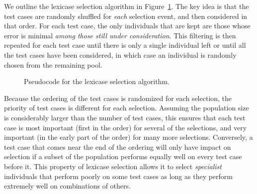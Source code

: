\documentclass{sig-alternate}
\begin{document}
We outline the lexicase selection algorithm in Figure~\ref{lexicase}. The key idea is that the test cases are randomly shuffled for \emph{each} selection event, and then considered in that order. For each test case, the only individuals that are kept are those whose error is minimal \emph{among those still under consideration}. This filtering is then repeated for each test case until there is only a single individual left or until all the test cases have been considered, in which case an individual is randomly chosen from the remaining pool.


\begin{figure}%
\centering
{}
\caption{\label{lexicase}Pseudocode for the lexicase selection algorithm.}
\end{figure}

Because the ordering of the test cases is randomized for each selection, the priority of test cases is different for each selection. Assuming the population size is considerably larger than the number of test cases, this ensures that each test case is most important (first in the order) for several of the selections, and very important (in the early part of the order) for many more selections. Conversely, a test case that comes near the end of the ordering will only have impact on selection if a subset of the population performs equally well on every test case before it. This property of lexicase selection allows it to select \textit{specialist} individuals that perform poorly on some test cases as long as they perform extremely well on combinations of others.
\end{document}

